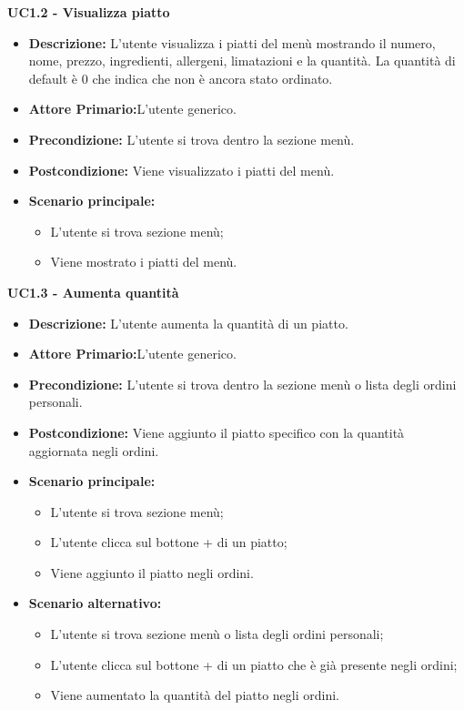 \textbf{UC1.2 - Visualizza piatto}
\begin{itemize}
    \item \textbf{Descrizione:} L'utente visualizza i piatti del menù mostrando il numero, nome, prezzo, ingredienti, allergeni, limatazioni e la quantità. La quantità di default è 0 che indica che non è ancora stato ordinato.
    \item \textbf{Attore Primario:}L'utente generico.
    \item \textbf{Precondizione:} L'utente si trova dentro la sezione menù.
    \item \textbf{Postcondizione:} Viene visualizzato i piatti del menù.
    \item \textbf{Scenario principale:}  
    \begin{itemize}
        \item L'utente si trova sezione menù;
        \item Viene mostrato i piatti del menù.
    \end{itemize}
\end{itemize}
\textbf{UC1.3 - Aumenta quantità}
\begin{itemize}
    \item \textbf{Descrizione:} L'utente aumenta la quantità di un piatto.
    \item \textbf{Attore Primario:}L'utente generico.
    \item \textbf{Precondizione:} L'utente si trova dentro la sezione menù o lista degli ordini personali.
    \item \textbf{Postcondizione:} Viene aggiunto il piatto specifico con la quantità aggiornata negli ordini.
    \item \textbf{Scenario principale:}
    \begin{itemize}
        \item L'utente si trova sezione menù;
        \item L'utente clicca sul bottone + di un piatto;
        \item Viene aggiunto il piatto negli ordini.
    \end{itemize}
    \item \textbf{Scenario alternativo:}
    \begin{itemize}
        \item L'utente si trova sezione menù o lista degli ordini personali;
        \item L'utente clicca sul bottone + di un piatto che è già presente negli ordini;
        \item Viene aumentato la quantità del piatto negli ordini.
    \end{itemize}
\end{itemize}

